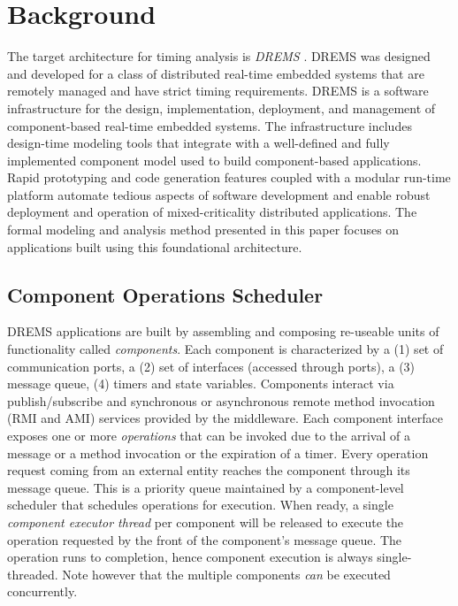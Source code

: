 \section{Background}
\label{sec:Target_System_Architecture}
The target architecture for timing analysis is \emph{DREMS} \cite{ISIS_F6_Aerospace:12,DREMS13Software}. DREMS was designed and developed for a class of distributed real-time embedded systems that are remotely managed and have strict timing requirements. DREMS is a software infrastructure for the design, implementation, deployment, and management of component-based real-time embedded systems. The infrastructure includes design-time modeling tools \cite{ISIS_F6_SFFMT:13} that integrate with a well-defined and fully implemented component model \cite{ISIS_F6_ISORC:13, MoDeVVa} used to build component-based applications. Rapid prototyping and code generation features coupled with a modular run-time platform automate tedious aspects of software development and enable robust deployment and operation of mixed-criticality distributed applications. The formal modeling and analysis method presented in this paper focuses on applications built using this foundational architecture.

\subsection{Component Operations Scheduler}

DREMS applications are built by assembling and composing re-useable units of functionality called \emph{components}. Each component is characterized by a (1) set of communication ports, a (2) set of interfaces (accessed through ports), a (3) message queue, (4) timers and state variables. Components interact via publish/subscribe and synchronous or asynchronous remote method invocation (RMI and AMI) services provided by the middleware. Each component interface exposes one or more \emph{operations} that can be invoked due to the arrival of a message or a method invocation or the expiration of a timer. Every operation request coming from an external entity reaches the component through its message queue. This is a priority queue maintained by a component-level scheduler that schedules operations for execution. When ready, a single \emph{component executor thread} per component will be released to execute the operation requested by the front of the component's message queue. The operation runs to completion, hence component execution is always single-threaded. Note however that the multiple components \emph{can} be executed concurrently. 


